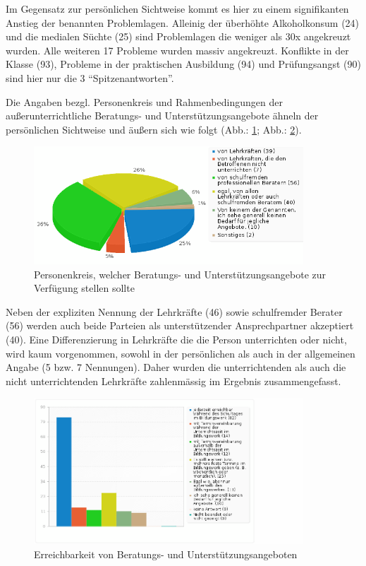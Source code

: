 \noindent
Im Gegensatz zur persönlichen Sichtweise kommt es hier zu einem signifikanten Anstieg der benannten Problemlagen. Alleinig der überhöhte Alkoholkonsum (24) und die medialen Süchte (25) sind Problemlagen die weniger als 30x angekreuzt wurden. Alle weiteren 17 Probleme wurden massiv angekreuzt. Konflikte in der Klasse (93), Probleme in der praktischen Ausbildung (94) und Prüfungsangst (90) sind hier nur die 3 "`Spitzenantworten"'.

Die Angaben bezgl. Personenkreis und Rahmenbedingungen der außerunterrichtliche Beratungs- und Unterstützungsangebote ähneln der persönlichen Sichtweise und äußern sich wie folgt (Abb.: \ref{fig:Personenkreis-fuer-unterstuetzungsangebote}; Abb.: \ref{fig:Erreichbarkeit-von-Beratungs-und-Unterstuetzungangeboten(2)}). 

\begin{figure}[h]
	\centering
		\includegraphics[width=0.9\textwidth]{images/Personenkreis-fuer-unterstuetzungsangebote.png}
	\caption{Personenkreis, welcher Beratungs- und Unterstützungsangebote zur Verfügung stellen sollte}
	\label{fig:Personenkreis-fuer-unterstuetzungsangebote}
\end{figure}

\noindent
Neben der expliziten Nennung der Lehrkräfte (46) sowie schulfremder Berater (56) werden auch beide Parteien als unterstützender Ansprechpartner akzeptiert (40). Eine Differenzierung in Lehrkräfte die die Person unterrichten oder nicht, wird kaum vorgenommen, sowohl in der persönlichen als auch in der allgemeinen Angabe (5 bzw. 7 Nennungen). Daher wurden die unterrichtenden als auch die nicht unterrichtenden Lehrkräfte zahlenmässig im Ergebnis zusammengefasst.

\begin{figure}
	\centering
		\includegraphics[width=0.9\textwidth]{images/Erreichbarkeit-von-Beratungs-und-Unterstuetzungangeboten(2).png}
	\caption{Erreichbarkeit von Beratungs- und Unterstützungsangeboten}
	\label{fig:Erreichbarkeit-von-Beratungs-und-Unterstuetzungangeboten(2)}
\end{figure}

